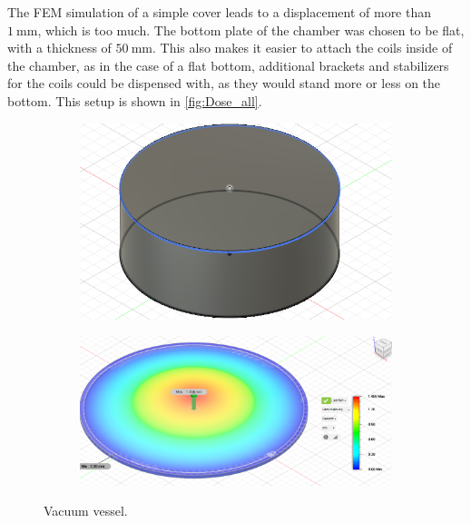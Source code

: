 The FEM simulation of a simple cover leads to a displacement of more than $ 1\ \si{\milli\meter}$, which is too much.
The bottom plate of the chamber was chosen to be flat, with a thickness of $50\ \si{\milli\meter}$.
This also makes it easier to attach the coils inside of the chamber, as in the case of a flat bottom, additional brackets and stabilizers for the coils could be dispensed with, as they would stand more or less on the bottom.
This setup is shown in \autoref{fig:Dose_all}.

\begin{figure}[H]
    \centering
    \begin{subfigure}[b]{0.4\textwidth}
        \centering
        \includegraphics[width=1\textwidth]{sections/imges/vacuum_vessel/Keksdose.PNG}
        \subcaption{}
        \label{fig:Dose}
    \end{subfigure}
    \hfill
    \begin{subfigure}[b]{0.49\textwidth}
        \centering
        \includegraphics[width=1\textwidth]{sections/imges/vacuum_vessel/Simulation_palatschinkendeckel.PNG}
        \label{fig:Dose_FEM}
    \end{subfigure}
    \caption{Vacuum vessel.}
    \label{fig:Dose_all}
\end{figure}


